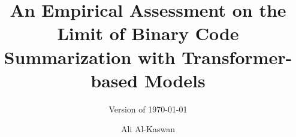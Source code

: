 \documentclass[twoside,a4paper,12pt]{memoir}
\title{An Empirical Assessment on the Limit of Binary Code Summarization with Transformer-based Models}
\subtitle{Version of \today}
\author{Ali Al-Kaswan}                               %
\begin{document}
\frontmatter
\thispagestyle{empty}
\makeformaltitlepages{}         %



\cleardoublepage\tableofcontents
\cleardoublepage\listoffigures
\cleardoublepage\mainmatter













\appendix
\def\chaptername{Appendix}

% 
\end{document}
